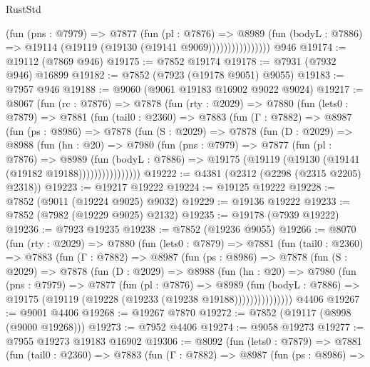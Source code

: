\begin{lexlean}{RustStd}
\begin{coremodule}
                        (fun (pns : @7979) =>
                        @7877
                          (fun (pl : @7876) =>
                          @8989
                            (fun (bodyL : @7886) =>
                            @19114 (@19119 (@19130 (@19141 @9069))))))))))))))))
    @946
@19174 := @19112 (@7869 @946)
@19175 := @7852 @19174
@19178 := @7931 (@7932 @946) @16899
@19182 := @7852 (@7923 (@19178 @9051) @9055)
@19183 := @7957 @946
@19188 := @9060 (@9061 @19183 @16902 @9022 @9024)
@19217 := @8067
    (fun (rc : @7876) =>
    @7878
      (fun (rty : @2029) =>
      @7880
        (fun (lets0 : @7879) =>
        @7881
          (fun (tail0 : @2360) =>
          @7883
            (fun (Γ : @7882) =>
            @8987
              (fun (ps : @8986) =>
              @7878
                (fun (S : @2029) =>
                @7878
                  (fun (D : @2029) =>
                  @8988
                    (fun (hn : @20) =>
                    @7980
                      (fun (pns : @7979) =>
                      @7877
                        (fun (pl : @7876) =>
                        @8989
                          (fun (bodyL : @7886) =>
                          @19175 (@19119 (@19130 (@19141 (@19182 @19188))))))))))))))))
@19222 := @4381 (@2312 (@2298 (@2315 @2205) @2318))
@19223 := @19217 @19222
@19224 := @19125 @19222
@19228 := @7852 (@9011 (@19224 @9025) @9032)
@19229 := @19136 @19222
@19233 := @7852 (@7982 (@19229 @9025) @2132)
@19235 := @19178 (@7939 @19222)
@19236 := @7923 @19235
@19238 := @7852 (@19236 @9055)
@19266 := @8070
    (fun (rty : @2029) =>
    @7880
      (fun (lets0 : @7879) =>
      @7881
        (fun (tail0 : @2360) =>
        @7883
          (fun (Γ : @7882) =>
          @8987
            (fun (ps : @8986) =>
            @7878
              (fun (S : @2029) =>
              @7878
                (fun (D : @2029) =>
                @8988
                  (fun (hn : @20) =>
                  @7980
                    (fun (pns : @7979) =>
                    @7877
                      (fun (pl : @7876) =>
                      @8989
                        (fun (bodyL : @7886) =>
                        @19175 (@19119 (@19228 (@19233 (@19238 @19188)))))))))))))))
    @4406
@19267 := @9001 @4406
@19268 := @19267 @7870
@19272 := @7852 (@19117 (@8998 (@9000 @19268)))
@19273 := @7952 @4406
@19274 := @9058 @19273
@19277 := @7955 @19273 @19183 @16902
@19306 := @8092
    (fun (lets0 : @7879) =>
    @7881
      (fun (tail0 : @2360) =>
      @7883
        (fun (Γ : @7882) =>
        @8987
          (fun (ps : @8986) =>

\end{coremodule}
\end{lexlean}
